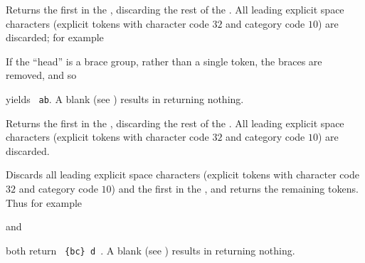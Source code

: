\documentclass[oneside]{book}
\begin{document}
\begin{function}{\TlHead}
\begin{syntax}
 
\end{syntax}
Returns the first  in the ,
discarding the rest of the .
All leading explicit space characters
(explicit tokens with character code $32$ and category code $10$)
are discarded; for example
\begin{demohigh}
\end{demohigh}
If the \enquote{head} is a brace group, rather than a single token,
the braces are removed, and so
\begin{codehigh}
\end{codehigh}
yields \verb*| ab|.
A blank  (see ) results in
 returning nothing.
\end{function}

\begin{function}{\TlVarHead}
\begin{syntax}
 
\end{syntax}
Returns the first  in the ,
discarding the rest of the .
All leading explicit space characters
(explicit tokens with character code $32$ and category code $10$)
are discarded.
\end{function}

\begin{function}{\TlTail}
\begin{syntax}
 
\end{syntax}
Discards all leading explicit space characters
(explicit tokens with character code $32$ and category code $10$)
and the first  in the , and returns the
remaining tokens. Thus for example
\begin{codehigh}
\end{codehigh}
and
\begin{codehigh}
\end{codehigh}
both return \verb*| {bc} d |.  A blank  (see )
results in  returning nothing.
\end{function}
\end{document}
